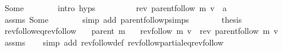 \begin{isabellebody}
\ Some\isanewline
\ \ \ \ \ \ \isamarkupfalse%
\ {\isacharparenleft}{\kern0pt}intro\ {\isachardoublequoteopen}{}{\isachardot}{\kern0pt}hyps{\isachardoublequoteclose}{\isacharparenright}{\kern0pt}\isanewline
\ \ \ \ \isamarkupfalse%
\ \isamarkupfalse%
\ {\isachardoublequoteopen}{\isachardot}{\kern0pt}{\isachardot}{\kern0pt}{\isachardot}{\kern0pt}\ {\isacharequal}{\kern0pt}\ rev\ {\isacharparenleft}{\kern0pt}parent{\isachardot}{\kern0pt}follow\ m\ v{\isacharparenright}{\kern0pt}\ {\isacharat}{\kern0pt}\ a{\isachardoublequoteclose}\isanewline
\ \ \ \ \ \ \isamarkupfalse%
\ assms\ Some\isanewline
\ \ \ \ \ \ \isamarkupfalse%
\ {\isacharparenleft}{\kern0pt}simp\ add{\isacharcolon}{\kern0pt}\ parent{\isachardot}{\kern0pt}follow{\isacharunderscore}{\kern0pt}psimps{\isacharparenright}{\kern0pt}\isanewline
\ \ \ \ \isamarkupfalse%
\ \isamarkupfalse%
\ {\isacharquery}{\kern0pt}thesis\isanewline
\ \ \ \ \ \ \isacommand{{\isachardot}{\kern0pt}}\isamarkupfalse%
\isanewline
\ \ \isamarkupfalse%
\isanewline
{}\isamarkupfalse%
%
\endisatagproof
{\isafoldproof}%
%
\isadelimproof
\isanewline
%
\endisadelimproof
\isanewline
{}\isamarkupfalse%
\ rev{\isacharunderscore}{\kern0pt}follow{\isacharunderscore}{\kern0pt}eq{\isacharunderscore}{\kern0pt}rev{\isacharunderscore}{\kern0pt}follow{\isacharcolon}{\kern0pt}\isanewline
\ \ \ {\isachardoublequoteopen}parent\ m{\isachardoublequoteclose}\isanewline
\ \ \ {\isachardoublequoteopen}rev{\isacharunderscore}{\kern0pt}follow\ m\ v\ {\isacharequal}{\kern0pt}\ rev\ {\isacharparenleft}{\kern0pt}parent{\isachardot}{\kern0pt}follow\ m\ v{\isacharparenright}{\kern0pt}{\isachardoublequoteclose}\isanewline
%
\isadelimproof
\ \ %
\endisadelimproof
%
\isatagproof
{}\isamarkupfalse%
\ assms\isanewline
\ \ \isamarkupfalse%
\ {\isacharparenleft}{\kern0pt}simp\ add{\isacharcolon}{\kern0pt}\ rev{\isacharunderscore}{\kern0pt}follow{\isacharunderscore}{\kern0pt}def\ rev{\isacharunderscore}{\kern0pt}follow{\isacharunderscore}{\kern0pt}partial{\isacharunderscore}{\kern0pt}eq{\isacharunderscore}{\kern0pt}rev{\isacharunderscore}{\kern0pt}follow{\isacharparenright}{\kern0pt}%
\endisatagproof
{\isafoldproof}%
%
\isadelimproof
\isanewline
%
\endisadelimproof
\isanewline
\isanewline
%
\isadelimtheory
\isanewline
%
\endisadelimtheory
%
\isatagtheory
{}\isamarkupfalse%
%
\endisatagtheory
{\isafoldtheory}%
%
\isadelimtheory
%
\endisadelimtheory
%
\end{isabellebody}%
